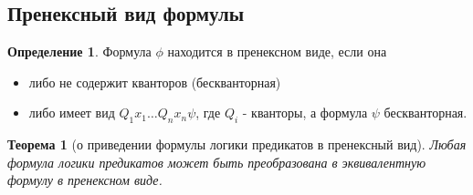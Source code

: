 \documentclass[a4paper]{article}
\newtheorem{theorem}{Теорема}[section]
\theoremstyle{definition}
\newtheorem*{definition}{Определение}
\theoremstyle{remark}
\begin{document}
    \subsection{Пренексный вид формулы}
    \begin{definition}
        Формула $\phi$ находится в пренексном виде, если она 
        \begin{itemize}
            \item либо не содержит кванторов (бескванторная)
            \item либо имеет вид $Q_1 x_1\dots Q_n x_n \psi$, где $Q_i$ - кванторы, а формула $\psi$ бескванторная.
        \end{itemize}
    \end{definition}
    \begin{theorem}[о приведении формулы логики предикатов в пренексный вид]
        Любая формула логики предикатов может быть преобразована в эквивалентную формулу в пренексном виде.
    \end{theorem}
\end{document}
